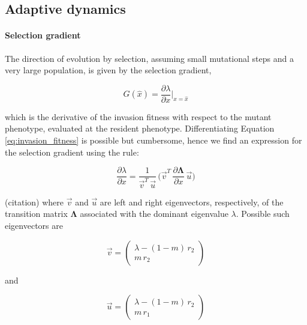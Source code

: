 \subsection*{Adaptive dynamics}

\paragraph{Selection gradient} The direction of evolution by selection, assuming small mutational steps and a very large population, is given by the selection gradient,

\begin{equation}
    G(\hat{x}) = \frac{\partial \lambda}{\partial x}\bigg|_{x=\hat{x}}
\end{equation}

which is the derivative of the invasion fitness with respect to the mutant phenotype, evaluated at the resident phenotype. Differentiating Equation \ref{eq:invasion_fitness} is possible but cumbersome, hence we find an expression for the selection gradient using the rule:

\begin{equation}
   \frac{\partial \lambda}{\partial x}\bigg = \frac{1}{\overrightarrow{v}^T\,\overrightarrow{u}} \, \bigg( \overrightarrow{v}^T \, \frac{\partial \pmb{\Lambda}}{\partial x} \, \overrightarrow{u} \bigg)
   \label{eq:deriv_fitness}
\end{equation}

(citation) where $\overrightarrow{v}$ and $\overrightarrow{u}$ are left and right eigenvectors, respectively, of the transition matrix $\pmb{\Lambda}$ associated with the dominant eigenvalue $\lambda$. Possible such eigenvectors are

\begin{equation}
    \overrightarrow{v} = 
    \begin{pmatrix}
        \lambda - (1-m)\,r_2 \\
        m\,r_2 
    \end{pmatrix}
    \label{eq:left_eigenvector}
\end{equation}

and

\begin{equation}
    \overrightarrow{u} = 
    \begin{pmatrix}
        \lambda - (1-m)\,r_2 \\
        m\,r_1
    \end{pmatrix}
\end{equation}

